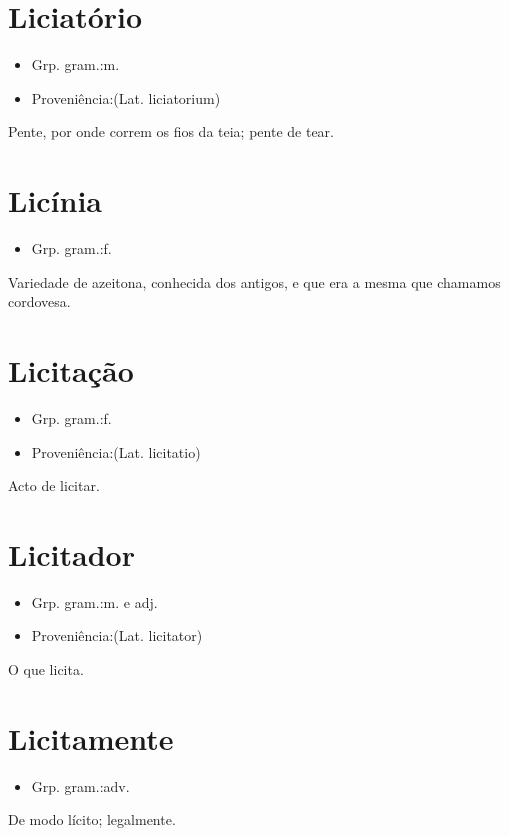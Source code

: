 \section{Liciatório}
\begin{itemize}
\item {Grp. gram.:m.}
\end{itemize}
\begin{itemize}
\item {Proveniência:(Lat. \textunderscore liciatorium\textunderscore )}
\end{itemize}
Pente, por onde correm os fios da teia; pente de tear.
\section{Licínia}
\begin{itemize}
\item {Grp. gram.:f.}
\end{itemize}
Variedade de azeitona, conhecida dos antigos, e que era a mesma que chamamos \textunderscore cordovesa\textunderscore .
\section{Licitação}
\begin{itemize}
\item {Grp. gram.:f.}
\end{itemize}
\begin{itemize}
\item {Proveniência:(Lat. \textunderscore licitatio\textunderscore )}
\end{itemize}
Acto de licitar.
\section{Licitador}
\begin{itemize}
\item {Grp. gram.:m.  e  adj.}
\end{itemize}
\begin{itemize}
\item {Proveniência:(Lat. \textunderscore licitator\textunderscore )}
\end{itemize}
O que licita.
\section{Licitamente}
\begin{itemize}
\item {Grp. gram.:adv.}
\end{itemize}
De modo lícito; legalmente.
